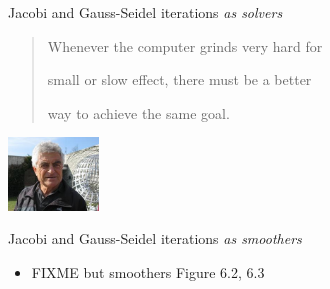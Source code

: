 \documentclass[10pt,
               svgnames,
               hyperref={colorlinks,citecolor=DeepPink4,linkcolor=FireBrick,urlcolor=Maroon},
               usepdftitle=false]{beamer}
\begin{document}
\begin{frame}{Jacobi and Gauss-Seidel iterations \emph{as solvers}}
\begin{itemize}
\begin{quotation}
Whenever the computer grinds very hard for

small or slow effect, there must be a better

way to achieve the same goal.
\end{quotation}

\vspace{-19mm}
\hfill \includegraphics[width=0.18\textwidth]{images/abrandt.jpg}
\end{itemize}
\end{frame}


\begin{frame}{Jacobi and Gauss-Seidel iterations \emph{as smoothers}}
\begin{itemize}
\item FIXME but smoothers Figure 6.2, 6.3


\end{itemize}
\end{frame}
\end{document}

